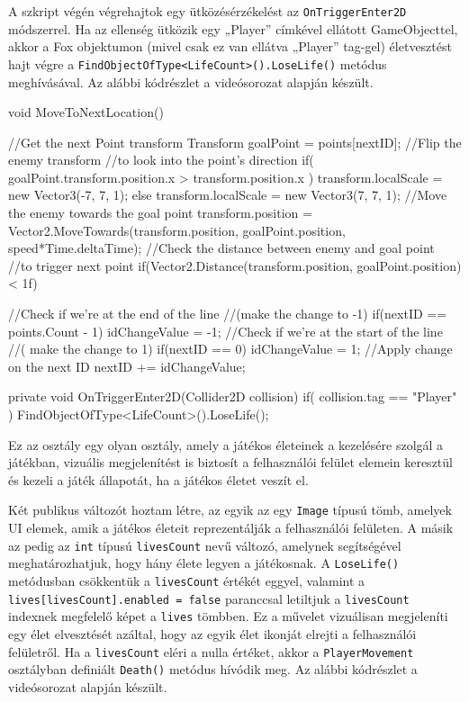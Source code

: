 A szkript végén végrehajtok egy ütközésérzékelést az \texttt{OnTriggerEnter2D} módszerrel. Ha az ellenség ütközik egy „Player” címkével ellátott GameObjecttel, akkor a Fox objektumon (mivel csak ez van ellátva „Player” tag-gel) életvesztést hajt végre a \texttt{FindObjectOfType<LifeCount>().LoseLife()} metódus meghívásával. Az alábbi kódrészlet a \cite{youtubeplaylist} videósorozat alapján készült.

\begin{java}
void MoveToNextLocation()
{
    //Get the next Point transform
    Transform goalPoint = points[nextID];
    //Flip the enemy transform
    //to look into the point's direction
    if( goalPoint.transform.position.x > 
        transform.position.x ) 
    {
        transform.localScale = 
            new Vector3(-7, 7, 1);
    }
    else
    {
        transform.localScale = 
            new Vector3(7, 7, 1);
    }
    //Move the enemy towards the goal point
    transform.position = 
        Vector2.MoveTowards(transform.position, 
        goalPoint.position, speed*Time.deltaTime);
    //Check the distance between enemy and goal point
    //to trigger next point
    if(Vector2.Distance(transform.position, 
        goalPoint.position) < 1f)
    {
        //Check if we're at the end of the line
        //(make the change to -1)
        if(nextID == points.Count - 1)
        {
            idChangeValue = -1;
        }
        //Check if we're at the start of the line
        //( make the change to 1)
        if(nextID == 0)
        {
            idChangeValue = 1;
        }
        //Apply change on the next ID
        nextID += idChangeValue;
        
    }
}

private void OnTriggerEnter2D(Collider2D collision)
{
    if( collision.tag == "Player" )
    {
        FindObjectOfType<LifeCount>().LoseLife();
    }
}
\end{java}


Ez az osztály egy olyan osztály, amely a játékos életeinek a kezelésére szolgál a játékban, vizuális megjelenítést is biztosít a felhasználói felület elemein keresztül és kezeli a játék állapotát, ha a játékos életet veszít el.

Két publikus változót hoztam létre, az egyik az egy \texttt{Image} típusú tömb, amelyek UI elemek, amik a játékos életeit reprezentálják a felhasználói felületen. A másik az pedig az \texttt{int} típusú \texttt{livesCount} nevű változó, amelynek segítségével meghatározhatjuk, hogy hány élete legyen a játékosnak. A \texttt{LoseLife()} metódusban csökkentük a \texttt{livesCount} értékét eggyel, valamint a \texttt{lives[livesCount].enabled = false} paranccsal letiltjuk a \texttt{livesCount} indexnek megfelelő képet a \texttt{lives} tömbben. Ez a művelet vizuálisan megjeleníti egy élet elvesztését azáltal, hogy az egyik élet ikonját elrejti a felhasználói felületről. Ha a \texttt{livesCount} eléri a nulla értéket, akkor a \texttt{PlayerMovement} osztályban definiált \texttt{Death()} metódus hívódik meg. Az alábbi kódrészlet a \cite{youtubeplaylist} videósorozat alapján készült.

